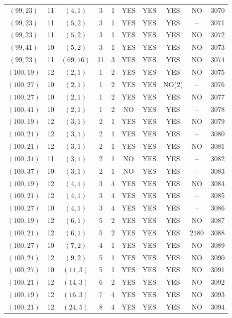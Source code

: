 \begin{longtable}{|c|c|c|c|c|c|c|c|c|c|}
$(99, 23)$ & 11 & $(4, 1)$ & 3 & 1 & YES & YES & YES & NO & 3070\\
$(99, 23)$ & 11 & $(5, 2)$ & 3 & 1 & YES & YES & YES & -- & 3071\\
$(99, 23)$ & 11 & $(5, 2)$ & 3 & 1 & YES & YES & YES & NO & 3072\\
$(99, 41)$ & 10 & $(5, 2)$ & 3 & 1 & YES & YES & YES & NO & 3073\\
$(99, 23)$ & 11 & $(69, 16)$ & 11 & 3 & YES & YES & YES & NO & 3074\\
$(100, 19)$ & 12 & $(2, 1)$ & 1 & 2 & YES & YES & YES & NO & 3075\\
$(100, 27)$ & 10 & $(2, 1)$ & 1 & 2 & YES & YES & NO(2) & -- & 3076\\
$(100, 27)$ & 10 & $(2, 1)$ & 1 & 2 & YES & YES & YES & NO & 3077\\
$(100, 41)$ & 10 & $(2, 1)$ & 1 & 2 & NO & YES & YES & -- & 3078\\
$(100, 19)$ & 12 & $(3, 1)$ & 2 & 1 & YES & YES & YES & NO & 3079\\
$(100, 21)$ & 12 & $(3, 1)$ & 2 & 1 & YES & YES & YES & -- & 3080\\
$(100, 21)$ & 12 & $(3, 1)$ & 2 & 1 & YES & YES & YES & NO & 3081\\
$(100, 31)$ & 11 & $(3, 1)$ & 2 & 1 & NO & YES & YES & -- & 3082\\
$(100, 37)$ & 10 & $(3, 1)$ & 2 & 1 & NO & YES & YES & -- & 3083\\
$(100, 19)$ & 12 & $(4, 1)$ & 3 & 4 & YES & YES & YES & NO & 3084\\
$(100, 21)$ & 12 & $(4, 1)$ & 3 & 4 & YES & YES & YES & -- & 3085\\
$(100, 27)$ & 10 & $(4, 1)$ & 3 & 4 & YES & YES & YES & -- & 3086\\
$(100, 19)$ & 12 & $(6, 1)$ & 5 & 2 & YES & YES & YES & NO & 3087\\
$(100, 21)$ & 12 & $(6, 1)$ & 5 & 2 & YES & YES & YES & 2180 & 3088\\
$(100, 27)$ & 10 & $(7, 2)$ & 4 & 1 & YES & YES & YES & NO & 3089\\
$(100, 21)$ & 12 & $(9, 2)$ & 5 & 1 & YES & YES & YES & NO & 3090\\
$(100, 27)$ & 10 & $(11, 3)$ & 5 & 1 & YES & YES & YES & NO & 3091\\
$(100, 21)$ & 12 & $(14, 3)$ & 6 & 2 & YES & YES & YES & NO & 3092\\
$(100, 19)$ & 12 & $(16, 3)$ & 7 & 4 & YES & YES & YES & NO & 3093\\
$(100, 21)$ & 12 & $(24, 5)$ & 8 & 4 & YES & YES & YES & NO & 3094\\

\end{longtable}
